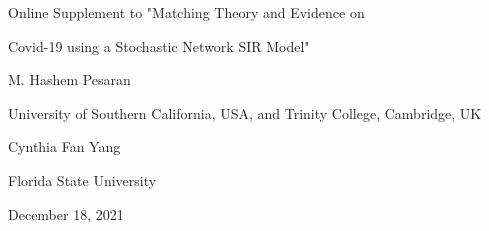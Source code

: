 \documentclass[12pt]{article}
\begin{document}
\clearpage
%

\appendix
%

\onehalfspacing
%

\vspace*{0.3cm}%


\begin{center}
{\Large Online Supplement to "Matching Theory and Evidence on }%

\vspace*{0.3cm}%
{\Large Covid-19 using a Stochastic Network SIR Model"\bigskip}

{\large M. Hashem Pesaran}

{\small University of Southern California, USA, and Trinity College,
Cambridge, UK\bigskip}

{\large Cynthia Fan Yang}

{\small Florida State University\bigskip}%

\large{December 18, 2021}

{\Large \bigskip}
\end{center}

%

\doublespacing
\normalsize
%

\renewcommand\theequation{S.\arabic{equation}}
\setcounter{equation}{0}
\renewcommand\thesection{S\arabic{section}}
\setcounter{section}{0}
\renewcommand\thepage{S\arabic{page}}
\setcounter{page}{1}
\setcounter{theorem}{1}
\renewcommand{\thefootnote}{S\arabic{footnote}}
\setcounter{footnote}{0}
\renewcommand{\thetable}{S.\arabic{table}}
\setcounter{table}{0}
\renewcommand\thefigure{S.\arabic{figure}}
\setcounter{figure}{0}
\renewcommand\thelemma{S.\arabic{lemma}}
\setcounter{lemma}{0}
\renewcommand\theremark{S.\arabic{remark}}
\setcounter{remark}{0}%
\end{document}
